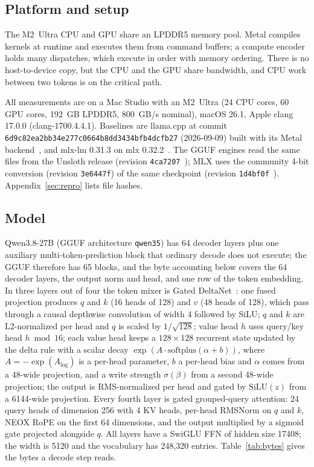 \documentclass[11pt]{article}
\begin{document}
\subsection{Platform and setup}
The M2~Ultra CPU and GPU share an LPDDR5 memory pool. Metal compiles
kernels at runtime and executes them from command buffers; a compute encoder
holds many dispatches, which execute in order with memory ordering. There is
no host-to-device copy, but the CPU and the GPU share bandwidth, and CPU work
between two tokens is on the critical path.

All measurements are on a Mac Studio with an M2~Ultra (24 CPU cores, 60 GPU
cores, 192~GB LPDDR5, 800~GB/s nominal), macOS 26.1, Apple clang 17.0.0
(clang-1700.4.4.1). Baselines are llama.cpp at commit
\texttt{6d9c82ea2bb34e277c0664b8dd3434bfb4dcfb27} (2026-09-09) built with its
Metal backend~\cite{llamacpp}, and mlx-lm 0.31.3 on mlx 0.32.2~\cite{mlxlm}.
The GGUF engines read the same files from the Unsloth release (revision
\texttt{4ca7207}~\cite{unslothdynamic}); MLX uses the community 4-bit
conversion (revision \texttt{3e6447f}) of the same checkpoint (revision
\texttt{1d4bf0f}~\cite{qwen35}). Appendix~\ref{sec:repro} lists file hashes.

\subsection{Model}
Qwen3.8-27B (GGUF architecture \texttt{qwen35}) has 64 decoder layers plus
one auxiliary multi-token-prediction block that ordinary decode does not
execute; the GGUF therefore has 65 blocks, and the byte accounting below
covers the 64 decoder layers, the output norm and head, and one row of the
token embedding. In three layers out of four the token mixer is Gated
DeltaNet~\cite{yang2025gateddeltanet}: one fused projection produces $q$ and
$k$ (16 heads of 128) and $v$ (48 heads of 128), which pass through a causal
depthwise convolution of width 4 followed by SiLU; $q$ and $k$ are
L2-normalized per head and $q$ is scaled by $1/\sqrt{128}$; value head $h$
uses query/key head $h \bmod 16$; each value head keeps a $128\times128$
recurrent state updated by the delta rule with a scalar decay
$\exp(A \cdot \mathrm{softplus}(\alpha + b))$, where $A = -\exp(A_{\log})$
is a per-head parameter, $b$ a per-head bias and $\alpha$ comes from a
48-wide projection, and a write strength $\sigma(\beta)$ from a second
48-wide projection; the output is RMS-normalized per head and gated by
$\mathrm{SiLU}(z)$ from a 6144-wide projection. Every fourth layer is gated
grouped-query attention: 24 query heads of dimension 256 with 4 KV heads,
per-head RMSNorm on $q$ and $k$, NEOX RoPE on the first 64 dimensions, and
the output multiplied by a sigmoid gate projected alongside $q$. All layers
have a SwiGLU FFN of hidden size 17408; the width is 5120 and the vocabulary
has 248,320 entries. Table~\ref{tab:bytes} gives the bytes a decode step
reads.
\end{document}
